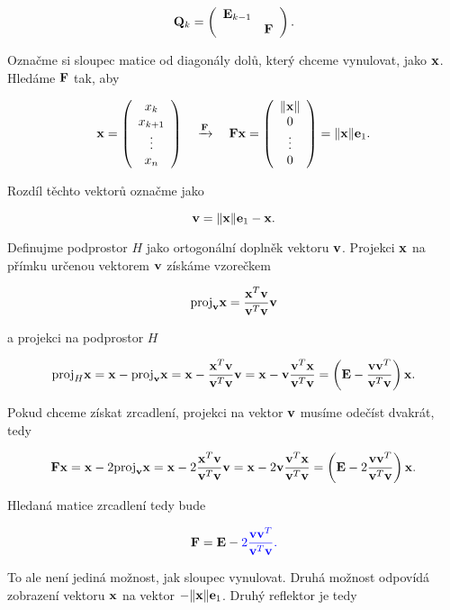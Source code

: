 \[ \mQ_k = \left({ \begin{array}{*{20}c} \mE_{k-1}  &    \\ &  \mF \\ \end{array}} \right). \]

\noindent Označme si sloupec matice od diagonály dolů, který chceme vynulovat, jako $\vx$.
Hledáme $\mF$ tak, aby

\[ \vx = \left({ \begin{array}{*{20}c} x_{k}   \\ x_{k+1} \\ \vdots  \\ x_{n}   \\ \end{array}} \right)
\quad
\xrightarrow{\mF}
\quad
\mF \vx = \left({ \begin{array}{*{20}c} \|\vx\| \\ 0 \\ \vdots \\ 0 \\ \end{array}} \right) = \|\vx\| \ve_1. 
\]

\noindent Rozdíl těchto vektorů označme jako

\[ \vv = \|\vx\|\ve_1 -\vx. \]

\noindent Definujme podprostor $H$ jako ortogonální doplněk vektoru $\vv$. Projekci $\vx$ na přímku určenou vektorem $\vv$ získáme vzorečkem

\[ \proj_{\vv}\vx = \frac{\vx^T \vv}{\vv^T \vv} \vv \]

\noindent a projekci na podprostor $H$

\[ \proj_{H}\vx = \vx - \proj_{\vv} \vx = \vx - \frac{\vx^T \vv}{\vv^T \vv} \vv = \vx -\vv \frac{\vv^T \vx}{\vv^T \vv} = \left(\mE - \frac{\vv\vv^T }{\vv^T \vv}\right)\vx. \]

\noindent Pokud chceme získat zrcadlení, projekci na vektor $\vv$ musíme odečíst dvakrát, tedy

\[ \mF\vx = \vx - 2\proj_{\vv} \vx = \vx - 2\frac{\vx^T \vv}{\vv^T \vv} \vv = \vx -2\vv \frac{\vv^T \vx}{\vv^T \vv} = \left(\mE - 2\frac{\vv\vv^T }{\vv^T \vv}\right)\vx. \]

\noindent Hledaná matice zrcadlení tedy bude

\[ \mF = \mE - \clr{blue}{2}\frac{\vv\vv^T }{\vv^T \vv}. \]

\noindent To ale není jediná možnost, jak sloupec vynulovat.
Druhá možnost odpovídá zobrazení vektoru $\vx$ na vektor $-\|\vx\|\ve_1$.
Druhý reflektor je tedy

